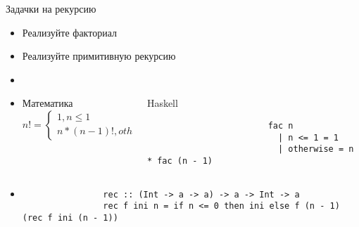     \begin{frame}[fragile]{Задачки на рекурсию}
        \begin{itemize}
            \item[\todo] Реализуйте факториал
            \item[\todo] Реализуйте примитивную рекурсию
            \item[\answer] \pause
            \item[] %
            \begin{columns}[onlytextwidth]
                \begin{column}{0.485\textwidth}
                    \begin{block}{Математика}
                        \[
                            n! =
                            \begin{cases}
                                1, n \le 1 \\
                                n * (n - 1)!, otherwise
                            \end{cases}
                        \]
                    \end{block}
                \end{column}\hfill%
                \begin{column}{0.485\textwidth}
                    \begin{block}{Haskell}
                        \begin{verbatim}
                        fac n
                          | n <= 1 = 1
                          | otherwise = n * fac (n - 1)
                        \end{verbatim}
                    \end{block}
                \end{column}
            \end{columns}
            \item[\answer] \pause
            \begin{verbatim}
                rec :: (Int -> a -> a) -> a -> Int -> a
                rec f ini n = if n <= 0 then ini else f (n - 1) (rec f ini (n - 1))
            \end{verbatim}
        \end{itemize}
    \end{frame}

